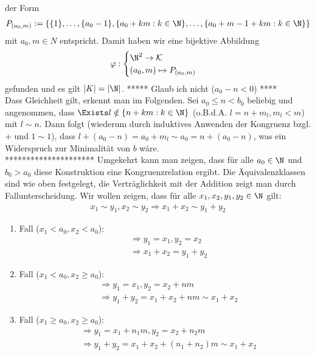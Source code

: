 \begin{solution}
\begin{itemize}
der Form
\begin{align*}
  P_{(a_0,m)} := \{\{1\},\dots,\{a_0 - 1\},\{a_0 + km: k \in \N\},\dots,\{a_0 + m - 1 + km: k \in \N\}\}
\end{align*}
mit $a_0,m \in N$ entspricht. Damit haben wir eine bijektive Abbildung
\begin{align*}
  \varphi: \begin{cases}
    \N^2 \rightarrow \mathcal{K} \\
    (a_0,m) \mapsto P_{(a_0,m)}
  \end{cases}
\end{align*}
gefunden und es gilt $|K| = |\N|$.
***** Glaub ich nicht ($a_0 - n < 0$) **** \\
Dass Gleichheit gilt, erkennt man im Folgenden. Sei $a_0 \leq n < b_0$ beliebig und angenommen, dass $\Exists l \notin \{n + km: k \in \N\}$ (o.B.d.A. $l = n + m_l, m_l < m$) mit $l \sim n$. Dann folgt (wiederum durch induktives Anwenden der Kongruenz bzgl. $+$ und $1 \sim 1$), dass $l + (a_0 - n) = a_0 + m_l \sim a_0 = n + (a_0 - n)$, was ein Widerspruch zur Minimalität von $b$ wäre.\\
*********************
Umgekehrt kann man zeigen, dass für alle $a_0 \in \N$ und $b_0 > a_0$ diese Konstruktion eine Kongruenzrelation ergibt. Die Äquivalenzklassen sind wie oben festgelegt, die Verträglichkeit mit der Addition zeigt man durch Fallunterscheidung.
Wir wollen zeigen, dass für alle $x_1,x_2,y_1,y_2 \in \N$ gilt:
\begin{align*}
  x_1 \sim y_1,x_2 \sim y_2 \Rightarrow x_1 + x_2 \sim y_1 + y_2
\end{align*}

\begin{enumerate}[label = \textit{\arabic*.}]
\item Fall ($x_1 < a_0, x_2 < a_0$):
\begin{align*}
  &\Rightarrow y_1 = x_1, y_2 = x_2 \\
  &\Rightarrow x_1 + x_2 = y_1 + y_2
\end{align*}
\item Fall ($x_1 < a_0, x_2 \geq a_0$):
\begin{align*}
  &\Rightarrow y_1 = x_1, y_2 = x_2 + nm \\
  &\Rightarrow  y_1 + y_2 = x_1 + x_2 + nm \sim x_1 + x_2
\end{align*}
\item Fall ($x_1 \geq a_0, x_2 \geq a_0$):
\begin{align*}
  &\Rightarrow y_1 = x_1 + n_1 m, y_2 = x_2 + n_2 m \\
  &\Rightarrow  y_1 + y_2 = x_1 + x_2 + (n_1+n_2) m \sim x_1 + x_2
\end{align*}
\end{enumerate}


\end{itemize}
\end{solution}
